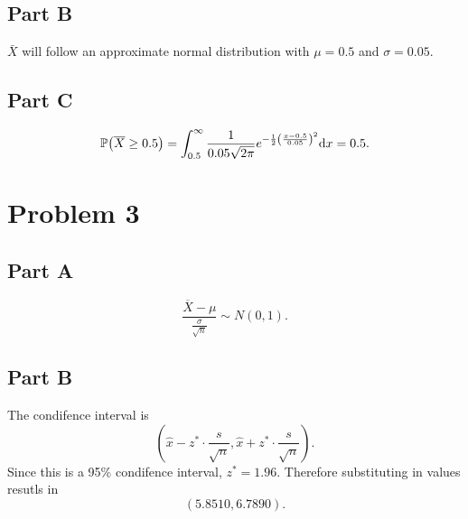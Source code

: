 \documentclass[12pt]{extarticle}
\begin{document}
\subsection*{Part B}
$\bar{X}$ will follow an approximate normal distribution with $\mu = 0.5$ and $\sigma = 0.05$.

\subsection*{Part C}
\[
	\mathbb{P}\qty(\overline{X} \geq 0.5) = \int_{0.5}^\infty \frac{1}{0.05 \sqrt{2\pi}} e^{-\frac{1}{2}\qty(\frac{x-0.5}{0.05})^2} \dd x = 0.5
.\]

\section*{Problem 3}
\subsection*{Part A}
\[
	\frac{\overline{X} - \mu}{\frac{\sigma}{\sqrt{n}}} \sim N(0,1)
.\]

\subsection*{Part B}
The condifence interval is
\[
	(\hat{x} - z^* \cdot \frac{s}{\sqrt{n}}, \hat{x} + z^* \cdot \frac{s}{\sqrt{n}})
.\]
Since this is a 95\% condifence interval, $z^* = 1.96$. Therefore substituting in values resutls in
\[
	(5.8510, 6.7890)
.\]
\end{document}
